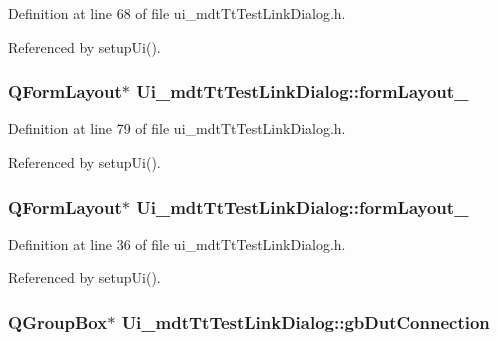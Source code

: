 Definition at line 68 of file ui\-\_\-mdt\-Tt\-Test\-Link\-Dialog.\-h.



Referenced by setup\-Ui().

\hypertarget{class_ui__mdt_tt_test_link_dialog_ae48aaae719e4b0147bc3da94455ece5f}{
\subsubsection[{form\-Layout\-\_\-4}]{\setlength{\rightskip}{0pt plus 5cm}Q\-Form\-Layout$\ast$ Ui\-\_\-mdt\-Tt\-Test\-Link\-Dialog\-::form\-Layout\-\_}}\label{class_ui__mdt_tt_test_link_dialog_ae48aaae719e4b0147bc3da94455ece5f}


Definition at line 79 of file ui\-\_\-mdt\-Tt\-Test\-Link\-Dialog.\-h.



Referenced by setup\-Ui().

\hypertarget{class_ui__mdt_tt_test_link_dialog_ab58597fe8f9187ed44b378ced9f1c5e9}{
\subsubsection[{form\-Layout\-\_\-5}]{\setlength{\rightskip}{0pt plus 5cm}Q\-Form\-Layout$\ast$ Ui\-\_\-mdt\-Tt\-Test\-Link\-Dialog\-::form\-Layout\-\_}}\label{class_ui__mdt_tt_test_link_dialog_ab58597fe8f9187ed44b378ced9f1c5e9}


Definition at line 36 of file ui\-\_\-mdt\-Tt\-Test\-Link\-Dialog.\-h.



Referenced by setup\-Ui().

\hypertarget{class_ui__mdt_tt_test_link_dialog_a2590ac65204df0f0e27d7002fab2dea1}{
\subsubsection[{gb\-Dut\-Connection}]{\setlength{\rightskip}{0pt plus 5cm}Q\-Group\-Box$\ast$ Ui\-\_\-mdt\-Tt\-Test\-Link\-Dialog\-::gb\-Dut\-Connection}}\label{class_ui__mdt_tt_test_link_dialog_a2590ac65204df0f0e27d7002fab2dea1}


